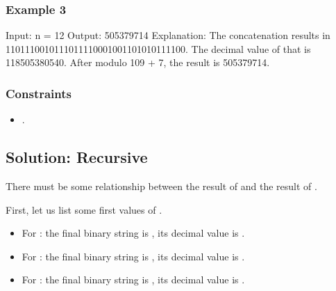 \documentclass[letterpaper,12pt,english]{book}
\begin{document}
\subsubsection{Example 3}
\label{\detokenize{Mathematics/09_MTH_1680_Concatenation_of_Consecutive_Binary_Numbers:example-3}}
\begin{sphinxVerbatim}[commandchars=\\\{\}]
Input: n = 12
Output: 505379714
Explanation: The concatenation results in \PYGZdq{}1101110010111011110001001101010111100\PYGZdq{}.
The decimal value of that is 118505380540.
After modulo 10\PYGZca{}9 + 7, the result is 505379714.
\end{sphinxVerbatim}


\subsubsection{Constraints}
\label{\detokenize{Mathematics/09_MTH_1680_Concatenation_of_Consecutive_Binary_Numbers:constraints}}\begin{itemize}
\item {} 
\sphinxAtStartPar
{}.

\end{itemize}


\subsection{Solution: Recursive}
\label{\detokenize{Mathematics/09_MTH_1680_Concatenation_of_Consecutive_Binary_Numbers:solution-recursive}}
\sphinxAtStartPar
There must be some relationship between the result of  and the result of .

\sphinxAtStartPar
First, let us list some first values of .
\begin{itemize}
\item {} 
\sphinxAtStartPar
For : the final binary string is , its decimal value is .

\item {} 
\sphinxAtStartPar
For : the final binary string is , its decimal value is .

\item {} 
\sphinxAtStartPar
For : the final binary string is , its decimal value is .

\end{itemize}
\end{document}
